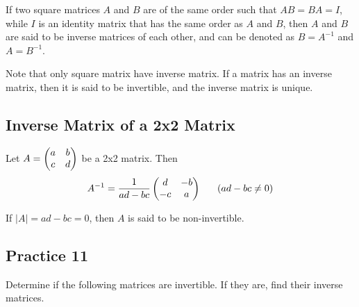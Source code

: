 \documentclass{report}
\begin{document}
\begin{multicols}{2}
  If two square matrices $A$ and $B$ are of the same order such that $AB=BA=I$,
  while $I$ is an identity matrix that has the same order as $A$ and $B$, then
  $A$ and $B$ are said to be inverse matrices of each other, and can be denoted
  as $B = A^{-1}$ and $A = B^{-1}$.

  Note that only square matrix have inverse matrix. If a matrix has an inverse
  matrix, then it is said to be invertible, and the inverse matrix is unique.

  \subsection*{Inverse Matrix of a 2x2 Matrix}

  Let $A = \begin{pmatrix} a & b \\ c & d \end{pmatrix}$ be a 2x2 matrix. Then
  \[
    A^{-1} = \frac{1}{ad-bc} \begin{pmatrix} d & -b \\ -c & a \end{pmatrix}
    \ \ \ \ \ (ad-bc \neq 0)
  \]

  If $|A| = ad - bc = 0$, then $A$ is said to be non-invertible.

  \subsection{Practice 11}

  Determine if the following matrices are invertible. If they are, find their
  inverse matrices.


\end{multicols}
\end{document}
